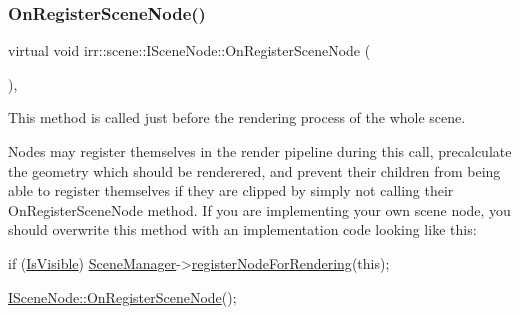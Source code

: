 \mbox{\label{classirr_1_1scene_1_1ISceneNode_ac9795bfcb88dcaf8cba6ea3296e5d8d0}} 
\subsubsection{\texorpdfstring{On\+Register\+Scene\+Node()}{OnRegisterSceneNode()}\hspace{0.1cm}{\footnotesize\ttfamily [1/2]}}
{\footnotesize\ttfamily virtual void irr\+::scene\+::\+I\+Scene\+Node\+::\+On\+Register\+Scene\+Node (\begin{DoxyParamCaption}{ }\end{DoxyParamCaption})\hspace{0.3cm}{\ttfamily [inline]}, {\ttfamily [virtual]}}



This method is called just before the rendering process of the whole scene. 

Nodes may register themselves in the render pipeline during this call, precalculate the geometry which should be renderered, and prevent their children from being able to register themselves if they are clipped by simply not calling their On\+Register\+Scene\+Node method. If you are implementing your own scene node, you should overwrite this method with an implementation code looking like this\+: 
\begin{DoxyCode}
\textcolor{keywordflow}{if} (\hyperlink{classirr_1_1scene_1_1ISceneNode_aa834128c57215457914ef46d9b18cc5e}{IsVisible})
    \hyperlink{classirr_1_1scene_1_1ISceneNode_a679d313cbe74b0c62285494a54334311}{SceneManager}->\hyperlink{classirr_1_1scene_1_1ISceneManager_aaf17bdde6d4e9ef61a76f3b43100ecb8}{registerNodeForRendering}(\textcolor{keyword}{this});

\hyperlink{classirr_1_1scene_1_1ISceneNode_ac9795bfcb88dcaf8cba6ea3296e5d8d0}{ISceneNode::OnRegisterSceneNode}();
\end{DoxyCode}
 \mbox{\label{classirr_1_1scene_1_1ISceneNode_ac9795bfcb88dcaf8cba6ea3296e5d8d0}} 
